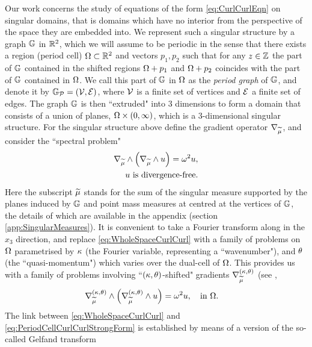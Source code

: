 Our work concerns the study of equations of the form \eqref{eq:CurlCurlEqn} on singular domains, that is domains which have no interior from the perspective of the space they are embedded into.
We represent such a singular structure by a graph $\mathbb{G}$ in $\mathbb{R}^2$, which we will assume to be periodic in the sense that there exists a region (period cell) $\Omega\subset\mathbb{R}^2$ and vectors $p_1, p_2$ such that for any $z\in\mathbb{Z}$ the part of $\mathbb{G}$ contained in the shifted regions $\Omega+p_1$ and $\Omega+p_2$ coincides with the part of $\mathbb{G}$ contained in $\Omega$.
We call this part of $\mathbb{G}$ in $\Omega$ as the \emph{period graph} of $\mathbb{G}$, and denote it by $\mathbb{G}_{\mathcal{P}}=\left( \mathcal{V}, \mathcal{E} \right)$, where $\mathcal{V}$ is a finite set of vertices and $\mathcal{E}$ a finite set of edges.
The graph $\mathbb{G}$ is then ``extruded" into 3 dimensions to form a domain that consists of a union of planes, $\Omega\times\left( 0,\infty \right)$, which is a 3-dimensional singular structure.
For the singular structure above define the gradient operator $\nabla_{\widetilde{\mu}}$, and consider the ``spectral problem"
\begin{subequations} \label{eq:WholeSpaceCurlCurl}
	\begin{align} 
		\nabla_{\widetilde{\mu}}\wedge \left(  \nabla_{\widetilde{\mu}}\wedge u  \right) = \omega^2 u &, \\
		u \text{ is divergence-free} &.
	\end{align}
\end{subequations}
Here the subscript $\widetilde{\mu}$ stands for the sum of the singular measure supported by the planes induced by $\mathbb{G}$ and point mass measures at centred at the vertices of $\mathbb{G}$, the details of which are available in the appendix (section \ref{app:SingularMeasures}).
It is convenient to take a Fourier transform along in the $x_3$ direction, and replace \eqref{eq:WholeSpaceCurlCurl} with a family of problems on $\Omega$ parametrised by $\kappa$ (the Fourier variable, representing a ``wavenumber"), and $\theta$ (the ``quasi-momentum") which varies over the dual-cell of $\Omega$.
This provides us with a family of problems involving ``$\left( \kappa, \theta \right)$-shifted" gradients $\nabla^{\left( \kappa, \theta \right)}_{\widetilde{\mu}}$ (see ,
\begin{align} \label{eq:PeriodCellCurlCurlStrongForm}
	\nabla_{\widetilde{\mu}}^{\left( \kappa, \theta \right)}\wedge \left(  \nabla_{\widetilde{\mu}}^{\left( \kappa, \theta \right)}\wedge u  \right) &= \omega^2 u, \quad\text{in } \Omega.
\end{align}
The link between \eqref{eq:WholeSpaceCurlCurl} and \eqref{eq:PeriodCellCurlCurlStrongForm} is established by means of a version of the so-called Gelfand transform \cite{gelfand1950expansion}
